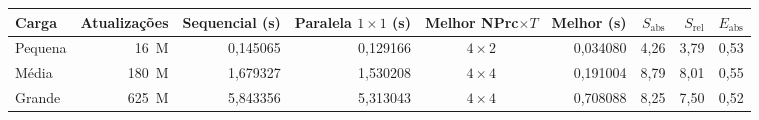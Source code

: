 \begin{tabular}{@{}lrrrcrrrr@{}}
\toprule
Carga & Atualizações & Sequencial (s) & Paralela $1{\times}1$ (s) & Melhor NPrc${\times}T$ & Melhor (s) & $S_\text{abs}$ & $S_\text{rel}$ & $E_\text{abs}$ \\
\midrule
Pequena & 16~M & 0{,}145065 & 0{,}129166 & $4{\times}2$ & 0{,}034080 & 4{,}26 & 3{,}79 & 0{,}53 \\
Média & 180~M & 1{,}679327 & 1{,}530208 & $4{\times}4$ & 0{,}191004 & 8{,}79 & 8{,}01 & 0{,}55 \\
Grande & 625~M & 5{,}843356 & 5{,}313043 & $4{\times}4$ & 0{,}708088 & 8{,}25 & 7{,}50 & 0{,}52 \\
\bottomrule
\end{tabular}
